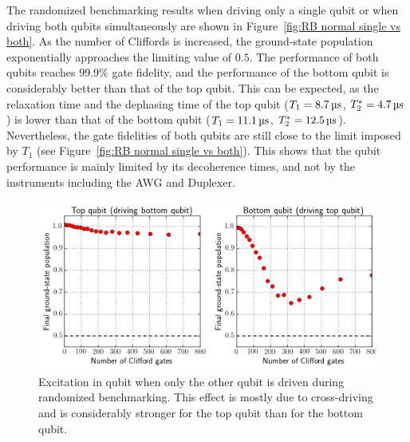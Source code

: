         The randomized benchmarking results when driving only a single qubit or when driving both qubits simultaneously are shown in Figure~\ref{fig:RB normal single vs both}. As the number of Cliffords is increased, the ground-state population exponentially approaches the limiting value of $0.5$. The performance of both qubits reaches $99.9\%$ gate fidelity, and the performance of the bottom qubit is considerably better than that of the top qubit.  This can be expected, as the relaxation time and the dephasing time of the top qubit ($T_1 = \text{\ensuremath{\SI{8.7}{\micro \second}}}$, $T_2^*=\text{\ensuremath{\SI{4.7}{\micro \second}}}$) is lower than that of the bottom qubit ($T_1 = \text{\ensuremath{\SI{11.1}{\micro \second}}}$, $T_2^*=\text{\ensuremath{\SI{12.5}{\micro \second}}}$). Nevertheless, the gate fidelities of both qubits are still close to the limit imposed by $T_1$ (see Figure~\ref{fig:RB normal single vs both}). This shows that the qubit performance is mainly limited by its decoherence times, and not by the instruments including the AWG and Duplexer.

        \begin{figure}[tb]
          \centering
          \includegraphics[width=\textwidth]{../Figures/Randomized benchmarking/RB_normal_cross-driving.png}
          \caption{Excitation in qubit when only the other qubit is driven during randomized benchmarking. This effect is mostly due to cross-driving and is considerably stronger for the top qubit than for the bottom qubit.}
          \label{fig:RB normal cross-driving}
        \end{figure}

